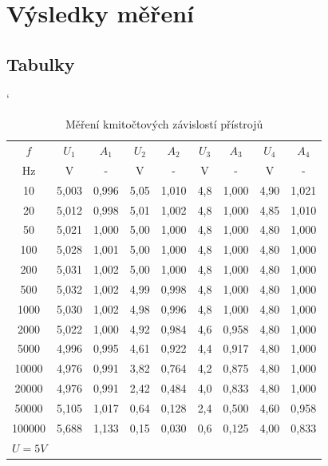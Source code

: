 \documentclass[a4paper, czech]{article}
\begin{document}
\section{Výsledky měření}

\subsection{Tabulky}

\begin{table}[H]
    \catcode`
    \centering
    \caption{Měření kmitočtových závislostí přístrojů}
    \begin{tabular}{ccccccccc}
        \toprule
        $f$      & $U_1$    & $A_1$    & $U_2$   & $A_2$    & $U_3$  & $A_3$    & $U_4$   & $A_4$    \\
        \cmidrule(rl){1-1}
        \cmidrule(rl){2-3}
        \cmidrule(rl){4-5}
        \cmidrule(rl){6-7}
        \cmidrule(rl){8-9}
        Hz     & V     & -     & V    & -     & V   & -     & V    & -     \\
        \midrule
        10     & 5,003 & 0,996 & 5,05 & 1,010 & 4,8 & 1,000 & 4,90 & 1,021 \\
        20     & 5,012 & 0,998 & 5,01 & 1,002 & 4,8 & 1,000 & 4,85 & 1,010 \\
        50     & 5,021 & 1,000 & 5,00 & 1,000 & 4,8 & 1,000 & 4,80 & 1,000 \\
        100    & 5,028 & 1,001 & 5,00 & 1,000 & 4,8 & 1,000 & 4,80 & 1,000 \\
        200    & 5,031 & 1,002 & 5,00 & 1,000 & 4,8 & 1,000 & 4,80 & 1,000 \\
        500    & 5,032 & 1,002 & 4,99 & 0,998 & 4,8 & 1,000 & 4,80 & 1,000 \\
        1000   & 5,030 & 1,002 & 4,98 & 0,996 & 4,8 & 1,000 & 4,80 & 1,000 \\
        2000   & 5,022 & 1,000 & 4,92 & 0,984 & 4,6 & 0,958 & 4,80 & 1,000 \\
        5000   & 4,996 & 0,995 & 4,61 & 0,922 & 4,4 & 0,917 & 4,80 & 1,000 \\
        10000  & 4,976 & 0,991 & 3,82 & 0,764 & 4,2 & 0,875 & 4,80 & 1,000 \\
        20000  & 4,976 & 0,991 & 2,42 & 0,484 & 4,0 & 0,833 & 4,80 & 1,000 \\
        50000  & 5,105 & 1,017 & 0,64 & 0,128 & 2,4 & 0,500 & 4,60 & 0,958 \\
        100000 & 5,688 & 1,133 & 0,15 & 0,030 & 0,6 & 0,125 & 4,00 & 0,833 \\
        \bottomrule
        \multicolumn{3}{l}{$U = 5V$}
    \end{tabular}
\end{table}
\end{document}
